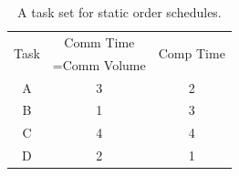 \documentclass[runningheads]{llncs} %
\begin{document}
	\begin{table}[htb]
	\begin{center}
	
		\begin{tabular}{|c|c|c|}
		\hline
		\multirow{2}{*}{Task} & Comm Time & \multirow{2}{*}{Comp Time}\\ 
		&=Comm Volume& \\ \hline
		A & 3 & 2\\ \hline
		B & 1 & 3\\ \hline
		C & 4 & 4\\ \hline
		D & 2 & 1\\ \hline
		\end{tabular}
	\caption{\label{tab:staticOrderExample} A task set for static order schedules.}
	\end{center}
	\end{table}
\end{document}
